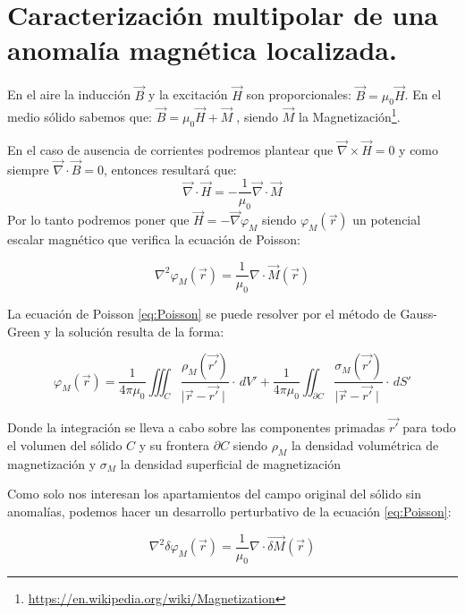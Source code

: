 \section{Caracterización multipolar de una anomalía magnética localizada.}
En el aire la inducción $\vec{B}$ y la excitación $\vec{H}$ son proporcionales: $\vec{B} = \mu_{0}\vec{H}$. En el medio sólido sabemos que: $\vec{B} = \mu_{0}\vec{H} + \vec{M}\;$, siendo $\vec{M}$ la Magnetización\footnote{\url{https://en.wikipedia.org/wiki/Magnetization}}. 

En el caso de ausencia de corrientes podremos plantear que $\vec{\nabla}\times\vec{H} = 0$ y como siempre $\vec{\nabla}\cdot\vec{B} = 0$, entonces resultará que:
\begin{equation}
	\label{eq:mediosLIH6}
	\vec{\nabla}\cdot\vec{H} = -\frac{1}{\mu_{0}}\vec{\nabla}\cdot\vec{M}
\end{equation}
Por lo tanto podremos poner que $\vec{H} = -\vec{\nabla}\varphi_{M}$ siendo $\varphi_{M}(\vec{r})$ un potencial escalar magnético que verifica la ecuación de Poisson:

\begin{equation}
	\label{eq:Poisson}
	\nabla^2\varphi_{M}(\vec{r}) = \frac{1}{\mu_{0}} \nabla \cdot\vec{M}(\vec{r}) 
\end{equation}

La ecuación de Poisson \ref{eq:Poisson} se puede resolver por el método de Gauss-Green \citep{GaussGreen} y la solución resulta de la forma:

\begin{equation}
	\label{eq:GaussGreen}
	\varphi_{M}(\vec{r}) = \frac{1}{4\pi\mu_{0}}\iiint_C \frac{\rho_{M}(\vec{r'})}{\mid\vec{r}-\vec{r'}\mid} \cdot \,dV' + 
	\frac{1}{4\pi\mu_{0}}\iint_{\partial C} \frac{\sigma_{M}(\vec{r'})}{\mid\vec{r}-\vec{r'}\mid} \cdot \,dS'
\end{equation}

Donde la integración se lleva a cabo sobre las componentes primadas $\vec{r'}$ para todo el volumen del sólido  $C$ y su frontera ${\partial C}$ siendo $\rho_{M}$ la densidad volumétrica de magnetización y $\sigma_{M}$ la densidad superficial de magnetización

Como solo nos interesan los apartamientos del campo original del sólido sin anomalías, podemos hacer un desarrollo perturbativo\citep{PerturbationMethod}\citep{SingularPerturbation} de la ecuación \ref{eq:Poisson}:



\begin{equation}
	\label{eq:PoissonPerturbada}
	\nabla^2\delta\varphi_{M}(\vec{r}) = \frac{1}{\mu_{0}} \nabla \cdot\vec{\delta M}(\vec{r}) 
\end{equation}

